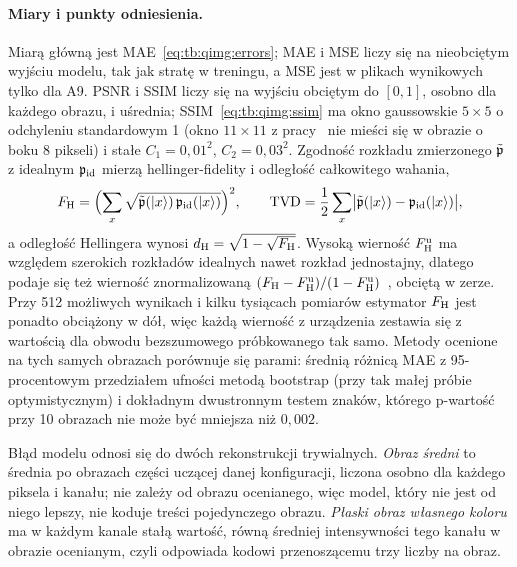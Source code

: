 \paragraph{Miary i punkty odniesienia.}\label{par:le:metrics}\label{par:le:baselines}
Miarą główną jest MAE~\eqref{eq:tb:qimg:errors}; MAE i MSE liczy się na nieobciętym wyjściu modelu, tak jak stratę w treningu, a MSE jest w plikach wynikowych tylko dla A9.
PSNR i SSIM liczy się na wyjściu obciętym do $[0,1]$, osobno dla każdego obrazu, i uśrednia; SSIM~\eqref{eq:tb:qimg:ssim} ma okno gaussowskie $5\times5$ o odchyleniu standardowym 1 (okno $11\times11$ z pracy~\cite{wang_image_2004} nie mieści się w obrazie o boku 8 pikseli) i stałe $C_1=0{,}01^2$, $C_2=0{,}03^2$.
Zgodność rozkładu zmierzonego $\tilde{\mathfrak{p}}$ z idealnym $\mathfrak{p}_{\mathrm{id}}$ mierzą \gls{hellinger-fidelity} i odległość całkowitego wahania,
\begin{equation}\label{eq:le:hellinger}
F_{\mathrm{H}}=\Bigl(\sum_{x}\sqrt{\tilde{\mathfrak{p}}(\ket{x})\,\mathfrak{p}_{\mathrm{id}}(\ket{x})}\Bigr)^{2},
\qquad
\mathrm{TVD}=\frac{1}{2}\sum_{x}\bigl|\tilde{\mathfrak{p}}(\ket{x})-\mathfrak{p}_{\mathrm{id}}(\ket{x})\bigr|,
\end{equation}
a odległość Hellingera wynosi $d_{\mathrm{H}}=\sqrt{1-\sqrt{F_{\mathrm{H}}}}$.
Wysoką wierność $F_{\mathrm{H}}^{\mathrm{u}}$ ma względem szerokich rozkładów idealnych nawet rozkład jednostajny, dlatego podaje się też wierność znormalizowaną $(F_{\mathrm{H}}-F_{\mathrm{H}}^{\mathrm{u}})/(1-F_{\mathrm{H}}^{\mathrm{u}})$~\cite{lubinski_application-oriented_2023}, obciętą w zerze.
Przy 512 możliwych wynikach i kilku tysiącach pomiarów estymator $F_{\mathrm{H}}$ jest ponadto obciążony w dół, więc każdą wierność z urządzenia zestawia się z wartością dla obwodu bezszumowego próbkowanego tak samo.
Metody ocenione na tych samych obrazach porównuje się parami: średnią różnicą MAE z 95-procentowym przedziałem ufności metodą bootstrap (przy tak małej próbie optymistycznym) i dokładnym dwustronnym testem znaków, którego p-wartość przy 10 obrazach nie może być mniejsza niż $0{,}002$.

Błąd modelu odnosi się do dwóch rekonstrukcji trywialnych.
\emph{Obraz średni} to średnia po obrazach części uczącej danej konfiguracji, liczona osobno dla każdego piksela i kanału; nie zależy od obrazu ocenianego, więc model, który nie jest od niego lepszy, nie koduje treści pojedynczego obrazu.
\emph{Płaski obraz własnego koloru} ma w każdym kanale stałą wartość, równą średniej intensywności tego kanału w obrazie ocenianym, czyli odpowiada kodowi przenoszącemu trzy liczby na obraz.

